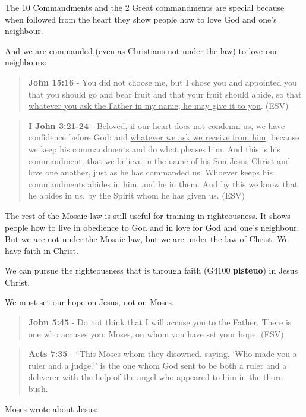 \documentclass[11pt]{article}
\begin{document}
The 10 Commandments and the 2 Great commandments are special because when followed from the heart they show people how to love God and one's neighbour.

And we are \uline{commanded} (even as Christians not \uline{under the law}) to love our neighbours:

\begin{quote}
\textbf{John 15:16} - You did not choose me, but I chose you and appointed you that you should go and bear fruit and that your fruit should abide, so that \uline{whatever you ask the Father in my name, he may give it to you}.􀀂(ESV)
\end{quote}

\begin{quote}
\textbf{I John 3:21-24} - Beloved, if our heart does not condemn us, we have confidence before God; and \uline{whatever we ask we receive from him}, because we keep his commandments and do what pleases him. And this is his commandment, that we believe in the name of his Son Jesus Christ and love one another, just as he has commanded us. Whoever keeps his commandments abides in him, and he in them. And by this we know that he abides in us, by the Spirit whom he has given us. (ESV)
\end{quote}

The rest of the Mosaic law is still useful for training in righteousness. It shows people how to live in obedience to God and in love for God and one's neighbour. But we are not under the Mosaic law, but we are under the law of Christ. We have faith in Christ.

We can pursue the righteousness that is through faith (G4100 \textbf{pisteuo}) in Jesus Christ.

We must set our hope on Jesus, not on Moses.

\begin{quote}
\textbf{John 5:45} -  Do not think that I will accuse you to the Father.  There is one who accuses you: Moses, on whom you have set your hope.  (ESV)
\end{quote}

\begin{quote}
\textbf{Acts 7:35} - “This Moses whom they disowned, saying, ‘Who made you a ruler and a judge?’ is the one whom God sent to be both a ruler and a deliverer with the help of the angel who appeared to him in the thorn bush.
\end{quote}

Moses wrote about Jesus:
\end{document}
